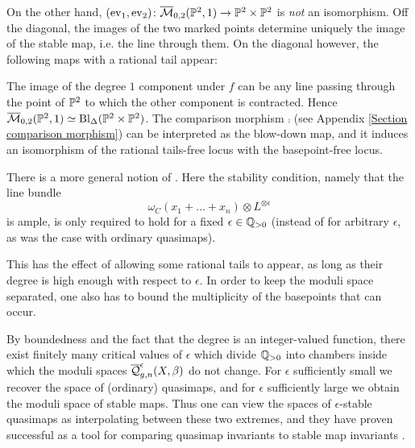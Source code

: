 \begin{example}
On the other hand, $(\operatorname{ev}_1,\operatorname{ev}_2)\colon\overline{\mathcal M}_{0,2}(\mathbb P^2,1)\rightarrow\mathbb P^2\times\mathbb P^2$ is \emph{not} an isomorphism. Off the diagonal, the images of the two marked points determine uniquely the image of the stable map, i.e. the line through them. On the diagonal however, the following maps with a rational tail appear:
\begin{center}
\end{center}
The image of the degree $1$ component under $f$ can be any line passing through the point of $\mathbb P^2$ to which the other component is contracted. Hence $\overline{\mathcal M}_{0,2}(\mathbb P^2,1)\simeq\operatorname{Bl}_{\Delta}(\mathbb P^2\times\mathbb P^2)$. The comparison morphism $\comp$ (see Appendix \ref{Section comparison morphism}) can be interpreted as the blow-down map, and it induces an isomorphism of the rational tails-free locus with the basepoint-free locus.
\end{example}


\begin{remark}
 There is a more general notion of  \cite[\S 7.1]{CFKM}. Here the stability condition, namely that the line bundle
\begin{equation*} \omega_C(x_1 + \ldots + x_n)\otimes L^{\otimes \epsilon} \end{equation*} 
is ample, is only required to hold for a fixed $\epsilon \in \mathbb{Q}_{>0}$ (instead of for arbitrary $\epsilon$, as was the case with ordinary quasimaps).

This has the effect of allowing some rational tails to appear, as long as their degree is high enough with respect to $\epsilon$. In order to keep the moduli space separated, one also has to bound the multiplicity of the basepoints that can occur.

By boundedness and the fact that the degree is an integer-valued function, there exist finitely many critical values of $\epsilon$ which divide $\mathbb{Q}_{>0}$ into chambers inside which the moduli spaces $\overline{\mathcal Q}^{\epsilon}_{g,n}(X,\beta)$ do not change.
For $\epsilon$ sufficiently small we recover the space of (ordinary) quasimaps, and for $\epsilon$ sufficiently large we obtain the moduli space of stable maps. Thus one can view the spaces of $\epsilon$-stable quasimaps as interpolating between these two extremes, and they have proven  successful as a tool for comparing quasimap invariants to stable map invariants \cite{CF-K-wallcrossing}.
\end{remark}


